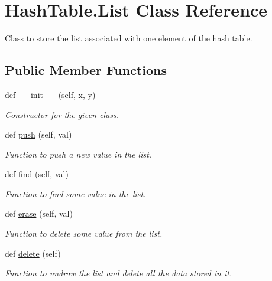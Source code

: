 \hypertarget{class_hash_table_1_1_list}{}\section{Hash\+Table.\+List Class Reference}
\label{class_hash_table_1_1_list}


Class to store the list associated with one element of the hash table.  


\subsection*{Public Member Functions}
\begin{DoxyCompactItemize}
\item 
def \hyperlink{class_hash_table_1_1_list_af469890a87f472122f5effd5438f04c7}{\+\_\+\+\_\+init\+\_\+\+\_\+} (self, x, y)
\begin{DoxyCompactList}\small\item\em Constructor for the given class. \end{DoxyCompactList}\item 
def \hyperlink{class_hash_table_1_1_list_ada3db777d3659dfeff1bdeb93c75f898}{push} (self, val)
\begin{DoxyCompactList}\small\item\em Function to push a new value in the list. \end{DoxyCompactList}\item 
def \hyperlink{class_hash_table_1_1_list_a274cd4a837d3859cb8d20553a928fd1b}{find} (self, val)
\begin{DoxyCompactList}\small\item\em Function to find some value in the list. \end{DoxyCompactList}\item 
def \hyperlink{class_hash_table_1_1_list_a173b36dbf5dab4c2c96290cec62e0d81}{erase} (self, val)
\begin{DoxyCompactList}\small\item\em Function to delete some value from the list. \end{DoxyCompactList}\item 
\mbox{\label{class_hash_table_1_1_list_a8e2a73bfa4ab6bb87136f1f9374333b4}} 
def \hyperlink{class_hash_table_1_1_list_a8e2a73bfa4ab6bb87136f1f9374333b4}{delete} (self)
\begin{DoxyCompactList}\small\item\em Function to undraw the list and delete all the data stored in it. \end{DoxyCompactList}\end{DoxyCompactItemize}
